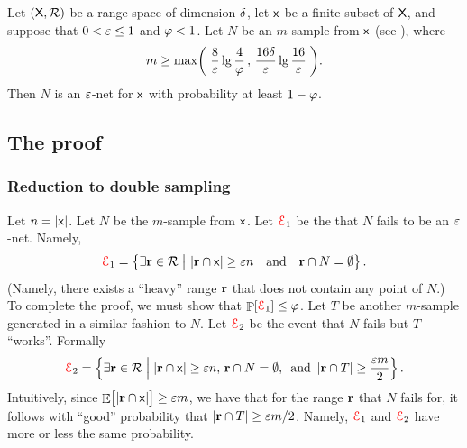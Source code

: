 \begin{theorem}
    Let $(\textsf{X},{\mathcal{R}})$ be a range space of \VC dimension
    $\delta$, let $\mathsf{x}$ be a finite subset of $\textsf{X}$, and
    suppose that $0 < {\varepsilon} \leq 1$ and $\varphi < 1$. Let $N$ be an
    $m$-sample from $\mathsf{x}$ (see ), where
    \begin{equation}
        m \geq \max\pth{\;
           \frac{8}{\eps} \lg \frac{4}{\BadProb} \,,\,
           \frac{16\Dim}{\eps}\lg \frac{16}{\eps} \;}.
        \eqlab{e:net:2}
    \end{equation}
    Then $N$ is an ${\varepsilon}$-net for $\mathsf{x}$ with probability at
    least $1-\varphi$.
\end{theorem}


\subsection{The proof}

\subsubsection{Reduction to double sampling}

Let $n = \left| {\mathsf{x}} \right|$.  Let $N$ be the $m$-sample from
$\mathsf{x}$.  Let ${\textcolor{red}{\EuScript{E}}}_1$ be the  that $N$ fails to be
an ${\varepsilon}$-net.  Namely,
\begin{equation*}
    \Event_1%
    =%
    \Set{ \exists{\range \in \RangeSet} }{\bigl.\ts
       \cardin{\range \cap \FGroundSet} \geq \eps n \text{ ~ and ~
       } \range \cap N = \emptyset}.    
\end{equation*}
(Namely, there exists a ``heavy'' range $\mathbf{r}$ that does not contain
any point of $N$.)  To complete the proof, we must show that
$\Prob{\Event_1}\leq \BadProb$. Let $T$ be another $m$-sample
generated in a similar fashion to $N$. Let ${\textcolor{red}{\EuScript{E}}}_2$ be the event
that $N$ fails but $T$ ``works''. Formally
\begin{equation*}
    \Event_2%
    =%
    \Set{\bigl. \exists{\range \in \RangeSet}}%
    {\bigl.\cardin{\range \cap \FGroundSet} \geq \eps n, \, \range \cap
       N = \emptyset, \, \text{ and } \cardin{\range \cap T} \geq
       \frac{\eps m}{2} }.
\end{equation*}
Intuitively, since
$\mathop{\mathbb{E}}\!\left[ {\bigl. \left| {\mathbf{r} \cap \mathsf{x}} \right| } \right] \geq {\varepsilon} m$, we have
that for the range $\mathbf{r}$ that $N$ fails for, it follows with
``good'' probability that $\left| {\mathbf{r} \cap T} \right| \geq {\varepsilon} m /
2$. Namely, ${\textcolor{red}{\EuScript{E}}}_1$ and ${\textcolor{red}{\EuScript{E}}}_2$ have more or less the same
probability.


